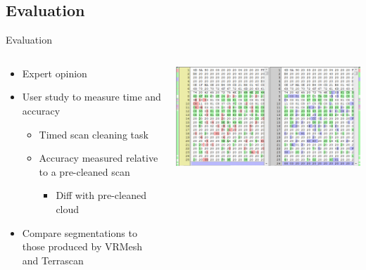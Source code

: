 \documentclass{beamer}
\begin{document}
\subsection{Evaluation}

\begin{frame}{Evaluation}
\begin{columns}[T]
\begin{column}{0.7\textwidth}
	\begin{itemize}
		\item Expert opinion
		\item User study to measure time and accuracy
		\begin{itemize}
			\item Timed scan cleaning task
			\item Accuracy measured relative to a pre-cleaned scan
			\begin{itemize}
				\item Diff with pre-cleaned cloud
			\end{itemize}
		\end{itemize}
		\item Compare segmentations to those produced by VRMesh and Terrascan
	\end{itemize}
	
\end{column}
\begin{column}{0.3\textwidth}
\includegraphics[width=1\textwidth]{pics/diff.png}
\end{column}
\end{columns}
\end{frame}
\end{document}
